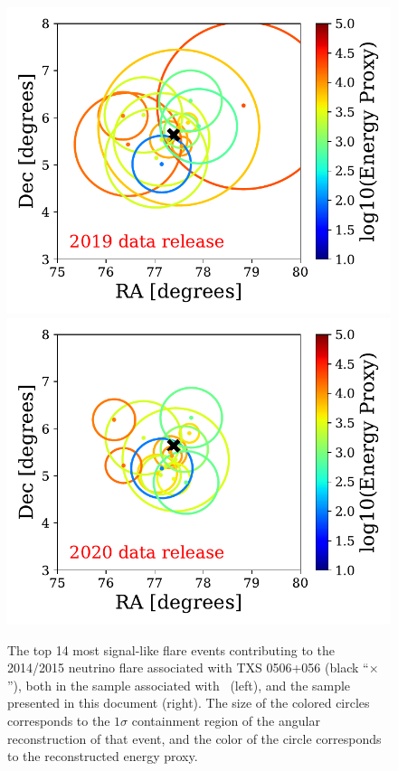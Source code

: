 \documentclass[aps,10pt,prd,twocolumn,floats,letterpaper,showpacs,nofootinbib,bibnotes,notitlepage,superscriptaddress,floatfix]{revtex4-1}
\begin{document}
\begin{figure}[p]
\centering
 \includegraphics[width=.45\linewidth]{./TXSCheckPlots/PSTracksv2evtplot.pdf}\hspace{0.2in}\includegraphics[width=.45\linewidth]{./TXSCheckPlots/PSTracksv3evtplot.pdf}
\caption[]{The top 14 most signal-like flare events contributing to the 2014/2015 neutrino flare associated with TXS 0506+056 (black ``$\times$''), both in the sample associated with~\cite{IceCube:2019} (left), and the sample presented in this document (right). The size of the colored circles corresponds to the $1\sigma$ containment region of the angular reconstruction of that event, and the color of the circle corresponds to the reconstructed energy proxy.}\label{fig:TXSEvtsCompare}
\end{figure}
\end{document}
